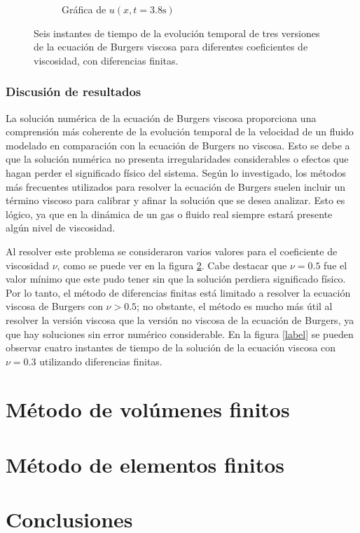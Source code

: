 \documentclass[12pt]{article}
\begin{document}
\begin{figure}[ht]
\begin{subfigure}{0.4\textwidth}
			\caption*{Gráfica de $u(x,t=3.8\unit{\second})$}
			\label{fig:vis1ddf6}
		\end{subfigure}
		\caption{Seis instantes de tiempo de la evolución temporal de tres versiones de la ecuación de Burgers viscosa para diferentes coeficientes de viscosidad, con diferencias finitas.}
		\label{fig:instantesvis1DDF}
	\end{figure}
	\subsubsection{Discusión de resultados}
	La solución numérica de la ecuación de Burgers viscosa proporciona una comprensión más coherente de la evolución temporal de la velocidad de un fluido modelado en comparación con la ecuación de Burgers no viscosa. Esto se debe a que la solución numérica no presenta irregularidades considerables o efectos que hagan perder el significado físico del sistema. Según lo investigado, los métodos más frecuentes utilizados para resolver la ecuación de Burgers suelen incluir un término viscoso para calibrar y afinar la solución que se desea analizar. Esto es lógico, ya que en la dinámica de un gas o fluido real siempre estará presente algún nivel de viscosidad.
	
	Al resolver este problema se consideraron varios valores para el coeficiente de viscosidad $\nu$, como se puede ver en la figura \ref{fig:instantesvis1DDF}. Cabe destacar que $\nu = 0.5$ fue el valor mínimo que este pudo tener sin que la solución perdiera significado físico. Por lo tanto, el método de diferencias finitas está limitado a resolver la ecuación viscosa de Burgers con $\nu > 0.5$; no obstante, el método es mucho más útil al resolver la versión viscosa que la versión no viscosa de la ecuación de Burgers, ya que hay soluciones sin error numérico considerable. En la figura \ref{label} se pueden observar cuatro instantes de tiempo de la solución de la ecuación viscosa con $\nu = 0.3$ utilizando diferencias finitas.
	\section{Método de volúmenes finitos}
	\section{Método de elementos finitos}
	\section{Conclusiones}
	
	\printbibliography
	
\end{document}
